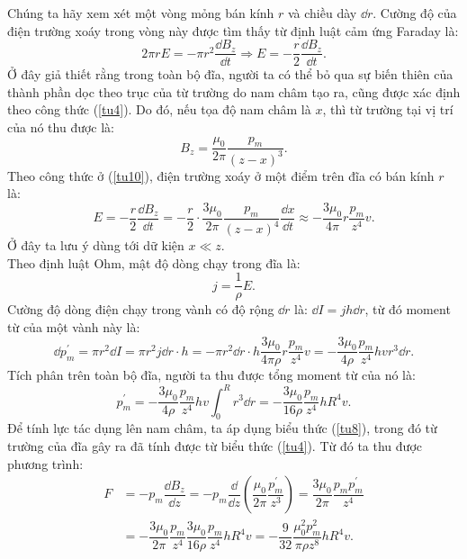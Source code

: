 \begin{loigiai}
\begin{enumerate}[1)]
\begin{enumerate}[a)]
\begin{center}
\end{center}
Chúng ta hãy xem xét một vòng mỏng bán kính $r$ và chiều dày $\dd r$. Cường độ của điện trường xoáy trong vòng này được tìm thấy từ định luật cảm ứng Faraday là:
\[
2 \pi r E=-\pi r^{2} \dfrac{\dd B_{z}}{\dd t} \Rightarrow E=-\dfrac{r}{2} \dfrac{\dd B_{z}}{\dd t}. \tag{10} \label{tu10}
\]
Ở đây giả thiết rằng trong toàn bộ đĩa, người ta có thể bỏ qua sự biến thiên của thành phần dọc theo  trục của từ trường do nam châm tạo ra, cũng được xác định theo công thức (\ref{tu4}). Do đó, nếu tọa độ nam châm là $x$, thì từ trường tại vị trí của nó thu được là:
\[
B_{z}=\dfrac{\mu_{0}}{2 \pi} \dfrac{p_{m}}{(z-x)^{3}}. \tag{11}
\]
Theo công thức ở (\ref{tu10}), điện trường xoáy ở một điểm trên đĩa có bán kính $r$ là:
\[
E=-\dfrac{r}{2} \dfrac{\dd B_{z}}{\dd t}=-\dfrac{r}{2} \cdot \dfrac{3 \mu_{0}}{2 \pi} \dfrac{p_{m}}{(z-x)^{4}} \dfrac{\dd x}{\dd t} \approx-\dfrac{3 \mu_{0}}{4 \pi} r \dfrac{p_{m}}{z^{4}} v. \tag{12}
\]
Ở đây ta lưu ý dùng tới dữ kiện $x \ll z$.\\
Theo định luật Ohm, mật độ dòng chạy trong đĩa là:
\[
j=\dfrac{1}{\rho} E. \tag{13}
\]
Cường độ dòng điện chạy trong vành có độ rộng $\dd r$ là: $\dd I=jh\dd r$, từ đó moment từ của một vành này là:
\[
\dd p_{m}^{\prime}=\pi r^{2} \dd I=\pi r^{2} j \dd r \cdot h=-\pi r^{2} \dd r \cdot h \dfrac{3 \mu_{0}}{4 \pi \rho} r \dfrac{p_{m}}{z^{4}} v=-\dfrac{3 \mu_{0}}{4 \rho} \dfrac{p_{m}}{z^{4}} h v r^{3} \dd r. \tag{14}
\]
Tích phân trên toàn bộ đĩa, người ta thu được tổng moment từ của nó là:
\[
p_{m}^{\prime}=-\dfrac{3 \mu_{0}}{4 \rho} \dfrac{p_{m}}{z^{4}} h v \int_{0}^{R} r^{3} \dd r=-\dfrac{3 \mu_{0}}{16 \rho} \dfrac{p_{m}}{z^{4}} h R^{4} v. \tag{15}
\]
Để tính lực tác dụng lên nam châm, ta áp dụng biểu thức (\ref{tu8}), trong đó từ trường của đĩa gây ra đã tính được từ biểu thức (\ref{tu4}). Từ đó ta thu được phương trình:
\begin{align*}
F&=-p_{m} \dfrac{\dd B_{z}}{\dd z}=-p_{m} \dfrac{\dd}{\dd z}\left(\dfrac{\mu_{0}}{2 \pi} \dfrac{p_{m}^{\prime}}{z^{3}}\right)=\dfrac{3 \mu_{0}}{2 \pi} \dfrac{p_{m} p_{m}^{\prime}}{z^{4}}\\
&=-\dfrac{3 \mu_{0}}{2 \pi} \dfrac{p_{m}}{z^{4}} \dfrac{3 \mu_{0}}{16 \rho} \dfrac{p_{m}}{z^{4}} h R^{4} v=-\dfrac{9}{32} \dfrac{\mu_{0}^{2} p_{m}^{2}}{\pi \rho z^{8}} h R^{4} v. \tag{16} \label{tu16}

\end{align*}
\end{enumerate}
\end{enumerate}
\end{loigiai}
